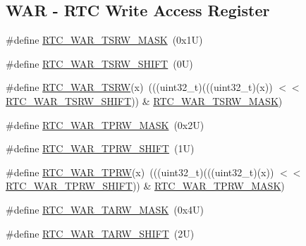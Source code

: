 \subsection*{W\+AR -\/ R\+TC Write Access Register}
\begin{DoxyCompactItemize}
\item 
\#define \mbox{\hyperlink{group___r_t_c___register___masks_ga4a43de9885f5d7ec5888d140315f1c15}{R\+T\+C\+\_\+\+W\+A\+R\+\_\+\+T\+S\+R\+W\+\_\+\+M\+A\+SK}}~(0x1\+U)
\item 
\#define \mbox{\hyperlink{group___r_t_c___register___masks_gabf5ee77e5695cd42b86430a86ae7208e}{R\+T\+C\+\_\+\+W\+A\+R\+\_\+\+T\+S\+R\+W\+\_\+\+S\+H\+I\+FT}}~(0\+U)
\item 
\#define \mbox{\hyperlink{group___r_t_c___register___masks_ga423df4efea6738f8e9c7935bf730053a}{R\+T\+C\+\_\+\+W\+A\+R\+\_\+\+T\+S\+RW}}(x)~(((uint32\+\_\+t)(((uint32\+\_\+t)(x)) $<$$<$ \mbox{\hyperlink{group___r_t_c___register___masks_gabf5ee77e5695cd42b86430a86ae7208e}{R\+T\+C\+\_\+\+W\+A\+R\+\_\+\+T\+S\+R\+W\+\_\+\+S\+H\+I\+FT}})) \& \mbox{\hyperlink{group___r_t_c___register___masks_ga4a43de9885f5d7ec5888d140315f1c15}{R\+T\+C\+\_\+\+W\+A\+R\+\_\+\+T\+S\+R\+W\+\_\+\+M\+A\+SK}})
\item 
\#define \mbox{\hyperlink{group___r_t_c___register___masks_gae9b8d07cbb9d8d13e57c8428a6379a6d}{R\+T\+C\+\_\+\+W\+A\+R\+\_\+\+T\+P\+R\+W\+\_\+\+M\+A\+SK}}~(0x2\+U)
\item 
\#define \mbox{\hyperlink{group___r_t_c___register___masks_ga5d66e90fa47b893ca2cb08835954db3d}{R\+T\+C\+\_\+\+W\+A\+R\+\_\+\+T\+P\+R\+W\+\_\+\+S\+H\+I\+FT}}~(1\+U)
\item 
\#define \mbox{\hyperlink{group___r_t_c___register___masks_gab982d186bbcbb2bbd4f3e31932e7e002}{R\+T\+C\+\_\+\+W\+A\+R\+\_\+\+T\+P\+RW}}(x)~(((uint32\+\_\+t)(((uint32\+\_\+t)(x)) $<$$<$ \mbox{\hyperlink{group___r_t_c___register___masks_ga5d66e90fa47b893ca2cb08835954db3d}{R\+T\+C\+\_\+\+W\+A\+R\+\_\+\+T\+P\+R\+W\+\_\+\+S\+H\+I\+FT}})) \& \mbox{\hyperlink{group___r_t_c___register___masks_gae9b8d07cbb9d8d13e57c8428a6379a6d}{R\+T\+C\+\_\+\+W\+A\+R\+\_\+\+T\+P\+R\+W\+\_\+\+M\+A\+SK}})
\item 
\#define \mbox{\hyperlink{group___r_t_c___register___masks_gab38b8a6dbc68530394f37411f8ae53f9}{R\+T\+C\+\_\+\+W\+A\+R\+\_\+\+T\+A\+R\+W\+\_\+\+M\+A\+SK}}~(0x4\+U)
\item 
\#define \mbox{\hyperlink{group___r_t_c___register___masks_gafbed3610e58c464a444dd08dc972fdfa}{R\+T\+C\+\_\+\+W\+A\+R\+\_\+\+T\+A\+R\+W\+\_\+\+S\+H\+I\+FT}}~(2\+U)

\end{DoxyCompactItemize}
